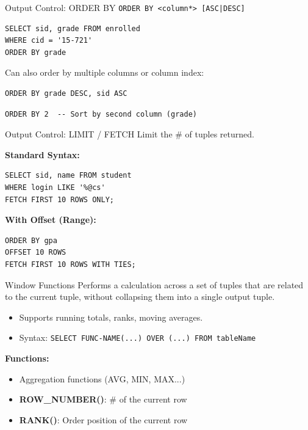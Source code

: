 \documentclass[aspectratio=169]{beamer}
\begin{document}
\begin{frame}[fragile]{Output Control: ORDER BY}
    \texttt{ORDER BY <column*> [ASC|DESC]}
    
    \begin{lstlisting}
SELECT sid, grade FROM enrolled
WHERE cid = '15-721'
ORDER BY grade
    \end{lstlisting}
    
    Can also order by multiple columns or column index:
    \begin{lstlisting}
ORDER BY grade DESC, sid ASC
    \end{lstlisting}
    
    \begin{lstlisting}
ORDER BY 2  -- Sort by second column (grade)
    \end{lstlisting}
\end{frame}

\begin{frame}[fragile]{Output Control: LIMIT / FETCH}
    Limit the \# of tuples returned.
    
    \textbf{Standard Syntax:}
    \begin{lstlisting}
SELECT sid, name FROM student
WHERE login LIKE '%@cs'
FETCH FIRST 10 ROWS ONLY;
    \end{lstlisting}
    
    \textbf{With Offset (Range):}
    \begin{lstlisting}
ORDER BY gpa
OFFSET 10 ROWS
FETCH FIRST 10 ROWS WITH TIES;
    \end{lstlisting}
\end{frame}

\begin{frame}{Window Functions}
    Performs a calculation across a set of tuples that are related to the current tuple, without collapsing them into a single output tuple.
    
    \begin{itemize}
        \item Supports running totals, ranks, moving averages.
        \item Syntax: \texttt{SELECT FUNC-NAME(...) OVER (...) FROM tableName}
    \end{itemize}
    
    \textbf{Functions:}
    \begin{itemize}
        \item Aggregation functions (AVG, MIN, MAX...)
        \item \textbf{ROW\_NUMBER()}: \# of the current row
        \item \textbf{RANK()}: Order position of the current row
    \end{itemize}
\end{frame}
\end{document}
